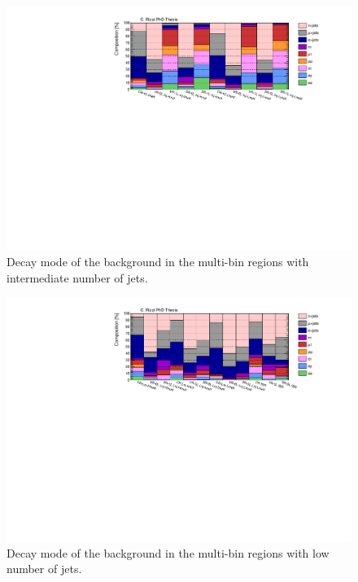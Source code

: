 \begin{figure}[htbp]
\includegraphics[width=\textwidth]{figures/Chap8/Rizzi-Fig8-24.pdf}
\caption{Decay mode of the \ttbar background in the multi-bin regions with intermediate number of jets.}
	\label{fig:ttcomp_Inj}
\end{figure}

\begin{figure}[htbp]
\includegraphics[width=\textwidth]{figures/Chap8/Rizzi-Fig8-25.pdf}
\caption{Decay mode of the \ttbar background in the multi-bin regions with low number of jets.}
	\label{fig:ttcomp_Lnj}
\end{figure}



